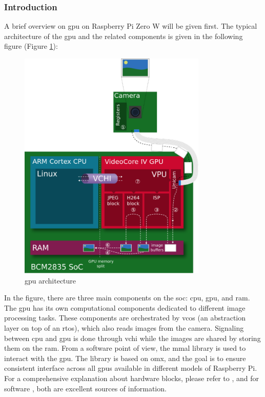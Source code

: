 \subsubsection{Introduction}
A brief overview on \ac{gpu} on Raspberry Pi Zero W will be given first. The typical architecture of the \ac{gpu} and the related components is given in the following figure (Figure \ref{fig:physical:gpu_architecture}):
 
 \begin{figure}[H]
    \centering
    \includegraphics[width=0.8\textwidth]{physical/figures/gpu_architecture}
    \caption{\ac{gpu} architecture \cite{jones_videocore_nodate-1}}
    \label{fig:physical:gpu_architecture}
\end{figure}

In the figure, there are three main components on the \ac{soc}: \ac{cpu}, \ac{gpu}, and \ac{ram}.
The \ac{gpu} has its own computational components dedicated to different image processing tasks.
These components are orchestrated by \ac{vcos} (an abstraction layer on top of an \ac{rtos}), which also reads images from the camera.
Signaling between \ac{cpu} and \ac{gpu} is done through \ac{vchi} while the images are shared by storing them on the \ac{ram}.
From a software point of view, the \ac{mmal} library is used to interact with the \ac{gpu}.
The library is based on \ac{omx}, and the goal is to ensure consistent interface across all \acp{gpu} available in different models of Raspberry Pi.
For a comprehensive explanation about hardware blocks, please refer to \cite{jones_videocore_nodate-1}, and for software \cite{jones_videocore_nodate}, both are excellent sources of information.

